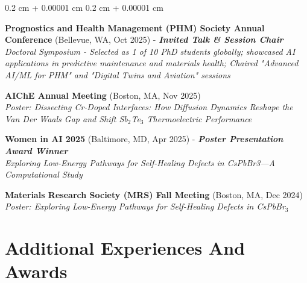 \documentclass[10pt, letterpaper]{article}
\newenvironment{onecolentry}{
    \begin{adjustwidth}{
        0.2 cm + 0.00001 cm
    }{
        0.2 cm + 0.00001 cm
    }
}{
    \end{adjustwidth}
} %
\let\hrefWithoutArrow\href
\renewcommand{\href}[2]{\hrefWithoutArrow{#1}{\mbox{\ifthenelse{\equal{#2}{}}{ }{#2 }\raisebox{.15ex}{\footnotesize \faExternalLink*}}}}
\begin{document}
\begin{onecolentry}
\textbf{Prognostics and Health Management (PHM) Society Annual Conference} (Bellevue, WA, Oct 2025) - \textbf{\textit{Invited Talk \& Session Chair}}
\\
\textit{Doctoral Symposium - Selected as 1 of 10 PhD students globally; showcased AI applications in predictive maintenance and materials health; Chaired "Advanced AI/ML for PHM" and "Digital Twins and Aviation" sessions}
\vspace{0.1 cm}

\textbf{AIChE Annual Meeting} (Boston, MA, Nov 2025)
\\
\textit{Poster: Dissecting Cr-Doped Interfaces: How Diffusion Dynamics Reshape the Van Der Waals Gap and Shift Sb$_2$Te$_3$ Thermoelectric Performance} 

\vspace{0.1 cm}


\textbf{Women in AI 2025} (Baltimore, MD, Apr 2025) - \textbf{\textit{Poster Presentation Award Winner}}\\
\textit{Exploring Low-Energy Pathways for Self-Healing Defects in CsPbBr3—A Computational Study}
\vspace{0.1 cm}


\textbf{Materials Research Society (MRS) Fall Meeting} (Boston, MA, Dec 2024)\\
\textit{Poster: Exploring Low-Energy Pathways for Self-Healing Defects in CsPbBr$_3$}
\end{onecolentry}

    \section{Additional Experiences And Awards}
\end{document}

